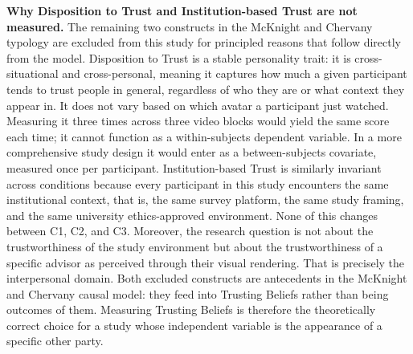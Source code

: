 \documentclass[11pt, a4paper]{article}
\begin{document}
\textbf{Why Disposition to Trust and Institution-based Trust are not measured.} The remaining two constructs in the McKnight and Chervany typology are excluded from this study for principled reasons that follow directly from the model. Disposition to Trust is a stable personality trait: it is cross-situational and cross-personal, meaning it captures how much a given participant tends to trust people in general, regardless of who they are or what context they appear in. It does not vary based on which avatar a participant just watched. Measuring it three times across three video blocks would yield the same score each time; it cannot function as a within-subjects dependent variable. In a more comprehensive study design it would enter as a between-subjects covariate, measured once per participant. Institution-based Trust is similarly invariant across conditions because every participant in this study encounters the same institutional context, that is, the same survey platform, the same study framing, and the same university ethics-approved environment. None of this changes between C1, C2, and C3. Moreover, the research question is not about the trustworthiness of the study environment but about the trustworthiness of a specific advisor as perceived through their visual rendering. That is precisely the interpersonal domain. Both excluded constructs are antecedents in the McKnight and Chervany causal model: they feed into Trusting Beliefs rather than being outcomes of them. Measuring Trusting Beliefs is therefore the theoretically correct choice for a study whose independent variable is the appearance of a specific other party.
\end{document}
